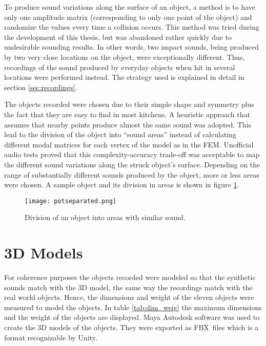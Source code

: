 To produce sound variations along the surface of an object, a method is to have only one amplitude matrix (corresponding to only one point of the object) and randomize the values every time a collision occurs.  This method was tried during the development of this thesis, but was abandoned rather quickly due to undesirable sounding results. In other words, two impact sounds, being produced by two very close locations on the object, were exceptionally different. Thus, recordings of the sound produced by everyday objects when hit in several locations were performed instead. The strategy used is explained in detail in section \ref{sec:recordings}.

The objects recorded were chosen due to their simple shape and symmetry plus the fact that they are easy to find in most kitchens. A heuristic approach that assumes that nearby points produce almost the same sound was adopted. This lead to the division of the object into ``sound areas'' instead of calculating different modal matrices for each vertex of the model as in the \gls{FEM}. Unofficial audio tests proved that this complexity-accuracy trade-off was acceptable to map the different sound variations along the struck object's surface. Depending on the range of substantially different sounds produced by the object, more or less areas were chosen. A sample object and its division in areas is shown in figure \ref{fig:pot_sep}. 

\begin{figure}[H]
  \centering
    \texttt{[image: potseparated.png]}
      \caption{Division of an object into areas with similar sound.}
      \label{fig:pot_sep}
\end{figure} 

\section{3D Models}

For coherence purposes the objects recorded were modeled so that the synthetic sounds match with the 3D model, the same way the recordings match with the real world objects. Hence, the dimensions and weight of the eleven objects were measured to model the objects. In table \ref{tab:dim_weig} the maximum dimensions and the weight of the objects are displayed. Maya Autodesk software was used to create the 3D models of the objects. They were exported as FBX\textsuperscript\textregistered\ files \cite{bib:fbx} which is a format recognizable by Unity\textsuperscript{\textregistered}.

